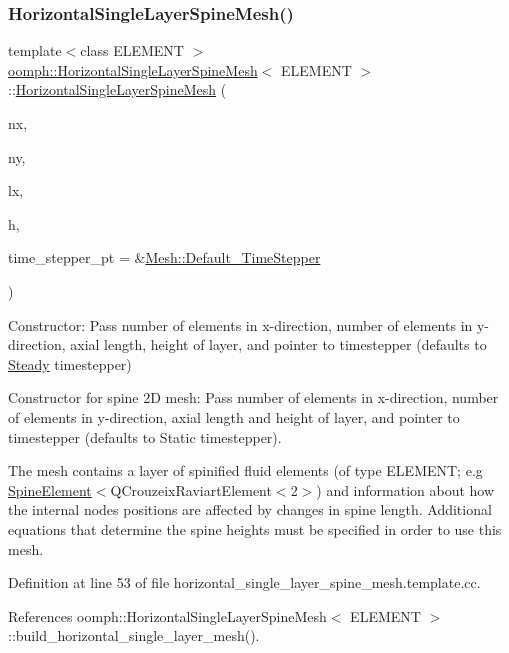 \subsubsection{\texorpdfstring{Horizontal\+Single\+Layer\+Spine\+Mesh()}{HorizontalSingleLayerSpineMesh()}}
{\footnotesize\ttfamily template$<$class E\+L\+E\+M\+E\+NT $>$ \\
\hyperlink{classoomph_1_1HorizontalSingleLayerSpineMesh}{oomph\+::\+Horizontal\+Single\+Layer\+Spine\+Mesh}$<$ E\+L\+E\+M\+E\+NT $>$\+::\hyperlink{classoomph_1_1HorizontalSingleLayerSpineMesh}{Horizontal\+Single\+Layer\+Spine\+Mesh} (\begin{DoxyParamCaption}\item[{const unsigned \&}]{nx,  }\item[{const unsigned \&}]{ny,  }\item[{const double \&}]{lx,  }\item[{const double \&}]{h,  }\item[{\hyperlink{classoomph_1_1TimeStepper}{Time\+Stepper} $\ast$}]{time\+\_\+stepper\+\_\+pt = {\ttfamily \&\hyperlink{classoomph_1_1Mesh_a12243d0fee2b1fcee729ee5a4777ea10}{Mesh\+::\+Default\+\_\+\+Time\+Stepper}} }\end{DoxyParamCaption})}



Constructor\+: Pass number of elements in x-\/direction, number of elements in y-\/direction, axial length, height of layer, and pointer to timestepper (defaults to \hyperlink{classoomph_1_1Steady}{Steady} timestepper) 

Constructor for spine 2D mesh\+: Pass number of elements in x-\/direction, number of elements in y-\/direction, axial length and height of layer, and pointer to timestepper (defaults to Static timestepper).

The mesh contains a layer of spinified fluid elements (of type E\+L\+E\+M\+E\+NT; e.\+g \hyperlink{classoomph_1_1SpineElement}{Spine\+Element}$<$Q\+Crouzeix\+Raviart\+Element$<$2$>$) and information about how the internal nodes positions are affected by changes in spine length. Additional equations that determine the spine heights must be specified in order to use this mesh. 

Definition at line 53 of file horizontal\+\_\+single\+\_\+layer\+\_\+spine\+\_\+mesh.\+template.\+cc.



References oomph\+::\+Horizontal\+Single\+Layer\+Spine\+Mesh$<$ E\+L\+E\+M\+E\+N\+T $>$\+::build\+\_\+horizontal\+\_\+single\+\_\+layer\+\_\+mesh().



